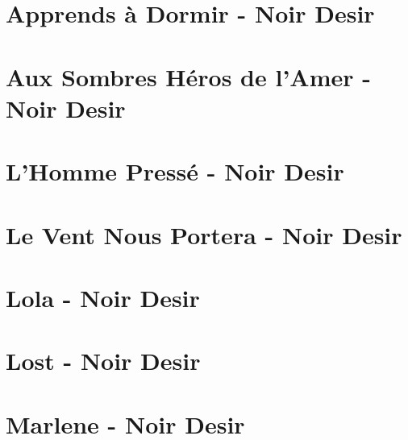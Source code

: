 \documentclass{guitartabs}
\begin{document}
\section*{Apprends à Dormir - Noir Desir}
\begin{guitar}

\end{guitar}

\section{Aux Sombres Héros de l'Amer - Noir Desir}
\begin{guitar}

\end{guitar}


\section*{L'Homme Pressé - Noir Desir}
\begin{guitar}

\end{guitar}

\section{Le Vent Nous Portera - Noir Desir}
\begin{guitar}

\end{guitar}


\section*{Lola - Noir Desir}
\begin{guitar}

\end{guitar}


\section*{Lost - Noir Desir}
\begin{guitar}

\end{guitar}

\section*{Marlene - Noir Desir}
\begin{guitar}

\end{guitar}
\end{document}
